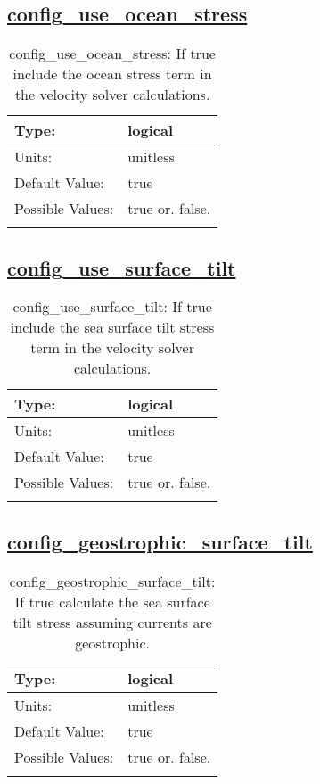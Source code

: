 \subsection[config\_use\_ocean\_stress]{\hyperref[sec:nm_tab_velocity_solver]{config\_use\_ocean\_stress}}
\label{subsec:nm_sec_config_use_ocean_stress}
\begin{center}
\begin{longtable}{| p{2.0in} || p{4.0in} |}
    \hline
    Type: & logical \\
    \hline
    Units: & \si{unitless} \\
    \hline
    Default Value: & true \\
    \hline
    Possible Values: & true or. false. \\
    \hline
    \caption{config\_use\_ocean\_stress: If true include the ocean stress term in the velocity solver calculations.}
\end{longtable}
\end{center}
\subsection[config\_use\_surface\_tilt]{\hyperref[sec:nm_tab_velocity_solver]{config\_use\_surface\_tilt}}
\label{subsec:nm_sec_config_use_surface_tilt}
\begin{center}
\begin{longtable}{| p{2.0in} || p{4.0in} |}
    \hline
    Type: & logical \\
    \hline
    Units: & \si{unitless} \\
    \hline
    Default Value: & true \\
    \hline
    Possible Values: & true or. false. \\
    \hline
    \caption{config\_use\_surface\_tilt: If true include the sea surface tilt stress term in the velocity solver calculations.}
\end{longtable}
\end{center}
\subsection[config\_geostrophic\_surface\_tilt]{\hyperref[sec:nm_tab_velocity_solver]{config\_geostrophic\_surface\_tilt}}
\label{subsec:nm_sec_config_geostrophic_surface_tilt}
\begin{center}
\begin{longtable}{| p{2.0in} || p{4.0in} |}
    \hline
    Type: & logical \\
    \hline
    Units: & \si{unitless} \\
    \hline
    Default Value: & true \\
    \hline
    Possible Values: & true or. false. \\
    \hline
    \caption{config\_geostrophic\_surface\_tilt: If true calculate the sea surface tilt stress assuming currents are geostrophic.}
\end{longtable}
\end{center}
